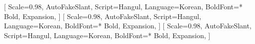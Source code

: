 \usepackage{kotex}
[
    Scale=0.98,
    AutoFakeSlant,
    Script=Hangul,
    Language=Korean,
    BoldFont=* Bold,
    Expansion,
]
[
    Scale=0.98,
    AutoFakeSlant,
    Script=Hangul,
    Language=Korean,
    BoldFont=* Bold,
    Expansion,
]
[
    Scale=0.98,
    AutoFakeSlant,
    Script=Hangul,
    Language=Korean,
    BoldFont=* Bold,
    Expansion,
]

\usepackage{setspace}

\usepackage{tabularray}

\usepackage{minted}

\newcommand{\latex}{\textrm{\LaTeX{}}}
\newcommand{\tex}{\textrm{\TeX{}}}
